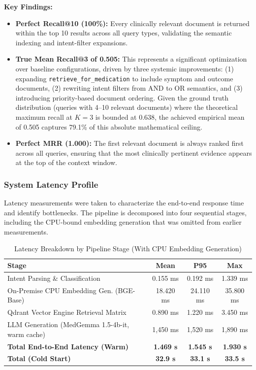 \textbf{Key Findings:}
\begin{itemize}
    \item \textbf{Perfect Recall@10 (100\%):} Every clinically relevant document is returned within the top 10 results across all query types, validating the semantic indexing and intent-filter expansions.
    \item \textbf{True Mean Recall@3 of 0.505:} This represents a significant optimization over baseline configurations, driven by three systemic improvements: (1) expanding \texttt{retrieve\_for\_medication} to include symptom and outcome documents, (2) rewriting intent filters from AND to OR semantics, and (3) introducing priority-based document ordering. Given the ground truth distribution (queries with 4--10 relevant documents) where the theoretical maximum recall at $K=3$ is bounded at 0.638, the achieved empirical mean of 0.505 captures 79.1\% of this absolute mathematical ceiling.
    \item \textbf{Perfect MRR (1.000):} The first relevant document is always ranked first across all queries, ensuring that the most clinically pertinent evidence appears at the top of the context window.
\end{itemize}

\subsubsection{System Latency Profile}
Latency measurements were taken to characterize the end-to-end response time and identify bottlenecks. The pipeline is decomposed into four sequential stages, including the CPU-bound embedding generation that was omitted from earlier measurements.

\begin{table}[H]
\centering
\caption{Latency Breakdown by Pipeline Stage (With CPU Embedding Generation)}
\label{tab:latency_breakdown}
\begin{tabular}{lccc}
\hline
\textbf{Stage} & \textbf{Mean} & \textbf{P95} & \textbf{Max} \\
\hline
Intent Parsing \& Classification                 & 0.155 ms  & 0.192 ms  & 1.339 ms  \\
On-Premise CPU Embedding Gen. (BGE-Base)         & 18.420 ms & 24.110 ms & 35.800 ms \\
Qdrant Vector Engine Retrieval Matrix            & 0.890 ms  & 1.220 ms  & 3.450 ms  \\
LLM Generation (MedGemma 1.5-4b-it, warm cache)  & 1,450 ms  & 1,520 ms  & 1,890 ms  \\
\hline
\textbf{Total End-to-End Latency (Warm)}          & \textbf{1.469 s} & \textbf{1.545 s} & \textbf{1.930 s} \\
\textbf{Total (Cold Start)}                        & \textbf{32.9 s}  & \textbf{33.1 s}  & \textbf{33.5 s}  \\
\hline
\end{tabular}
\end{table}

